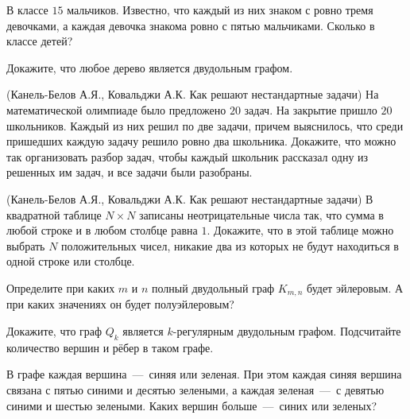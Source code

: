 \newpage
{}
	
\begin{exersize}
	В классе $15$ мальчиков. Известно, что каждый из них знаком с ровно тремя девочками, а каждая девочка знакома ровно с пятью мальчиками. Сколько в классе детей?
\end{exersize}

\begin{exersize}
	Докажите, что любое дерево является двудольным графом.
\end{exersize}

\begin{exersize}(Канель-Белов А.Я., Ковальджи А.К. Как решают нестандартные задачи)
	На математической олимпиаде было предложено $20$ задач. На закрытие пришло $20$ школьников. Каждый из них решил по две задачи, причем выяснилось, что среди пришедших каждую задачу решило ровно два школьника. Докажите, что можно так организовать разбор задач, чтобы каждый школьник рассказал одну из решенных им задач, и все задачи были разобраны.
\end{exersize}

\begin{exersize}(Канель-Белов А.Я., Ковальджи А.К. Как решают нестандартные задачи)
	В квадратной таблице $N \times N$ записаны неотрицательные числа так, что сумма в любой строке и в любом столбце равна $1$. Докажите, что в этой таблице можно выбрать $N$ положительных чисел, никакие два из которых не будут находиться в одной строке или столбце.
\end{exersize}

\begin{exersize}
	Определите при каких $m$ и $n$ полный двудольный граф $K_{m, n}$ будет эйлеровым. А при каких значениях он будет полуэйлеровым?
\end{exersize}

\begin{exersize}
	Докажите, что граф $Q_k$ является $k$-регулярным двудольным графом. Подсчитайте количество вершин и рёбер в таком графе.
\end{exersize}

\begin{exersize}
	В графе каждая вершина~---~синяя или зеленая. При этом каждая синяя вершина связана с пятью синими и десятью зелеными, а каждая зеленая~---~с девятью синими и шестью зелеными. Каких вершин больше~---~синих или зеленых?	
\end{exersize}

